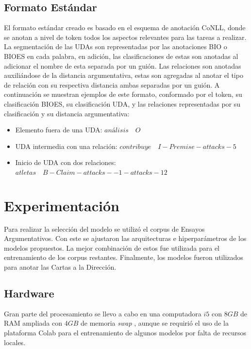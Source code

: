 \documentclass[a4paper,11pt,twocolumn,twoside]{article}
\begin{document}
\subsection{Formato Estándar}

El formato estándar creado es basado en el esquema de anotación CoNLL, donde se anotan a nivel de token todos los aspectos 
relevantes para las tareas a realizar. La segmentación de las UDAs son representadas por las anotaciones 
BIO o BIOES en cada palabra, en adición, las clasificaciones de estas son anotadas al adicionar el nombre 
de esta separada por un guión. Las relaciones son anotadas auxiliándose de la distancia argumentativa, estas 
son agregadas al anotar el tipo de relación con su respectiva distancia ambas separadas por un guión. A 
continuación se muestran ejemplos de este formato, conformado por el token, su clasificación BIOES, su clasificación
UDA, y las relaciones representadas por su clasificación y su distancia argumentativa:

\begin{itemize}
	\item Elemento fuera de una UDA: $an\text{á}lisis \quad O$
	\item UDA intermedia con una relación: $contribuye \quad I-Premise-attacks-5$
	\item Inicio de UDA con dos relaciones: $atletas \quad B-Claim-attacks--1-attacks-12$
\end{itemize}

\section{Experimentación}

Para realizar la selección del modelo se utilizó el corpus de Ensayos Argumentativos. Con este se ajustaron
las arquitecturas e hiperparámetros de los modelos propuestos. La mejor combinación de estos fue utilizada 
para el entrenamiento de los corpus restantes. Finalmente, los modelos fueron utilizados para anotar las Cartas 
a la Dirección. 

\subsection{Hardware}

Gran parte del procesamiento se llevo a cabo en una computadora $i5$ con $8GB$ de RAM ampliada con $4GB$ de memoria 
\textit{swap} \cite{swap}, aunque se requirió el uso de la plataforma Colab \cite{colab} para 
el entrenamiento de algunos modelos por falta de recursos locales.
\end{document}
